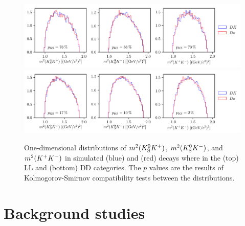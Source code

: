 \begin{figure}[tbp]
    \centering
    \includegraphics[width=\columnwidth]{figures/analysis/DP_thesis_s_KolSmi_KK_LL.pdf}
    \includegraphics[width=\columnwidth]{figures/analysis/DP_thesis_s_KolSmi_KK_DD.pdf}
    \caption{One-dimensional distributions of $m^2({{K}^0_{\mathrm{S}}}{{K}^+})$, $m^2({{K}^0_{\mathrm{S}}}{{K}^-})$, and $m^2({{K}^+}{{K}^-})$ in simulated (blue) \BtoDK and (red) \BtoDpi  decays where \DtoKsKK  in the (top) LL and (bottom) DD categories. The $p$ values are the results of Kolmogorov-Smirnov compatibility tests between the distributions.}
    \label{fig:KolSmi_KK}
\end{figure}


\FloatBarrier
\section{Background studies} %
\label{sec:background_studies}

